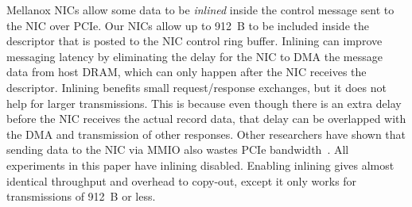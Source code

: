 Mellanox NICs allow some data to be {\em inlined} inside the control message
sent to the NIC over PCIe. Our NICs allow up to 912~B to be included inside the
descriptor that is posted to the NIC control ring buffer.  Inlining can improve
messaging latency by eliminating the delay for the NIC to DMA the message data
from host DRAM, which can only happen after the NIC receives the descriptor.
Inlining benefits small request/response exchanges, but it does not help for
larger transmissions. This is because even though there is an extra delay
before the NIC receives the actual record data, that delay can be overlapped
with the DMA and transmission of other responses. Other researchers have shown
that sending data to the NIC via MMIO also wastes PCIe bandwidth~\cite{rdma}.
All experiments in this paper have inlining disabled. Enabling inlining
gives almost identical throughput and overhead to copy-out, except it only
works for transmissions of 912~B or less.

